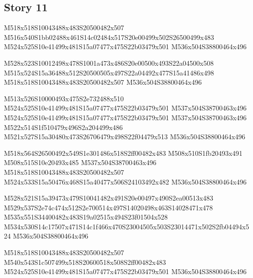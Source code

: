 \documentclass{article}
\begin{document}
\subsection{Story 11}

\begin{multicols}{5}
\begin{center}

M518x518S10043488x483S20500482x507 %
M516x540S1bb02488x461S14c02484x517S20e00499x502S26500499x483 %
M524x525S10e41499x481S15a07477x475S22b03479x501 %
M536x504S38800464x496 %

M528x523S10012498x478S1001a473x486S20e00500x493S22a04500x508 %
M515x524S15a36488x512S20500505x497S22a04492x477S15a41486x498 %
M518x518S10043488x483S20500482x507 %
M536x504S38800464x496 %

M513x526S10000493x475S2e732488x510 %
M524x525S10e41499x481S15a07477x475S22b03479x501 %
M537x504S38700463x496 %
M524x525S10e41499x481S15a07477x475S22b03479x501 %
M537x504S38700463x496 %
M522x514S1f510479x496S2a204499x486 %
M521x527S15a30480x473S26706479x498S22f04479x513 %
M536x504S38800464x496 %

M518x564S26500492x549S1e301486x518S2ff00482x483 %
M508x510S1fb20493x491 %
M508x515S10e20493x485 %
M537x504S38700463x496 %
M518x518S10043488x483S20500482x507 %
M524x533S15a50476x468S15a40477x506S24103492x482 %
M536x504S38800464x496 %

M528x521S15a39473x479S10041482x491S20e00497x490S2ea00513x483 %
M529x537S2e74c474x512S2e700514x497S14020498x463S14028471x478 %
M535x551S34400482x483S19a02515x494S23f01504x528 %
M534x530S14c17507x471S14c1f466x470S23004505x503S23014471x502S2fb04494x524 %
M536x504S38800464x496 %

M518x518S10043488x483S20500482x507 %
M540x543S1c507499x518S20600518x508S2ff00482x483 %
M524x525S10e41499x481S15a07477x475S22b03479x501 %
M536x504S38800464x496 %

\end{center}
\end{multicols}
\end{document}
